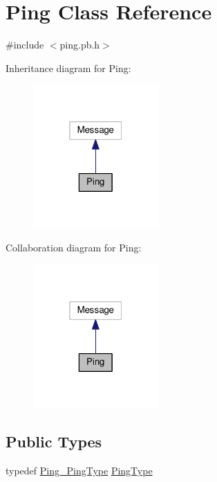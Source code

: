 \hypertarget{class_ping}{}\section{Ping Class Reference}
\label{class_ping}


{\ttfamily \#include $<$ping.\+pb.\+h$>$}



Inheritance diagram for Ping\+:
\nopagebreak
\begin{figure}[H]
\begin{center}
\leavevmode
\includegraphics[width=136pt]{class_ping__inherit__graph}
\end{center}
\end{figure}


Collaboration diagram for Ping\+:
\nopagebreak
\begin{figure}[H]
\begin{center}
\leavevmode
\includegraphics[width=136pt]{class_ping__coll__graph}
\end{center}
\end{figure}
\subsection*{Public Types}
\begin{DoxyCompactItemize}
\item 
typedef \hyperlink{ping_8pb_8h_a4b13f38feb620891e72b30e36aaaf35b}{Ping\+\_\+\+Ping\+Type} \hyperlink{class_ping_acc3eb96e81e502a66bab5fae841da9ab}{Ping\+Type}
\end{DoxyCompactItemize}
